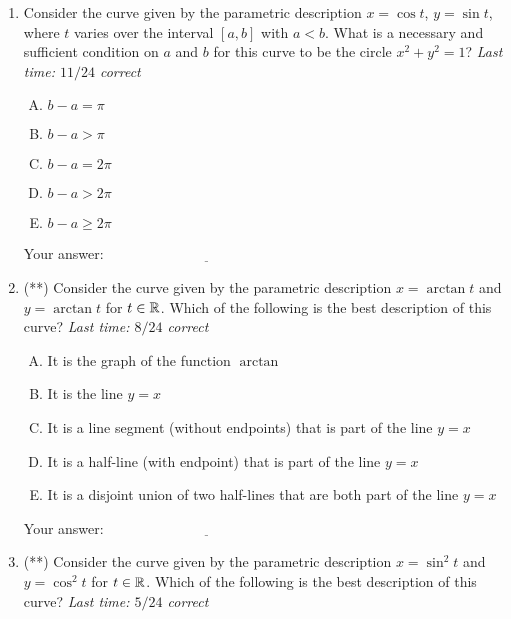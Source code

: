 \documentclass[10pt]{amsart}
\begin{document}
\begin{enumerate}
\item Consider the curve given by the parametric description $x = \cos
  t$, $y = \sin t$, where $t$ varies over the interval $[a,b]$ with $a
  < b$. What is a necessary and sufficient condition on $a$ and $b$
  for this curve to be the circle $x^2 + y^2 = 1$? {\em Last time:
    $11/24$ correct}

  \begin{enumerate}[(A)]
  \item $b - a =\pi$
  \item $b - a > \pi$
  \item $b - a = 2\pi$
  \item $b - a > 2\pi$
  \item $b - a \ge 2\pi$
  \end{enumerate}

  \vspace{0.1in}
  Your answer: $\underline{\qquad\qquad\qquad\qquad\qquad\qquad\qquad}$
  \vspace{0.6in}

\item (**) Consider the curve given by the parametric description $x =
  \arctan t$ and $y = \arctan t$ for $t \in \mathbb{R}$. Which of the
  following is the best description of this curve? {\em Last time:
    $8/24$ correct}

  \begin{enumerate}[(A)]
  \item It is the graph of the function $\arctan$
  \item It is the line $y = x$
  \item It is a line segment (without endpoints) that is part of the
    line $y = x$
  \item It is a half-line (with endpoint) that is part of the line $y
    = x$
  \item It is a disjoint union of two half-lines that are both part of
    the line $y = x$
  \end{enumerate}

  \vspace{0.1in}
  Your answer: $\underline{\qquad\qquad\qquad\qquad\qquad\qquad\qquad}$
  \vspace{0.6in}

\item (**) Consider the curve given by the parametric description $x =
  \sin^2t$ and $y = \cos^2t$ for $t \in \mathbb{R}$. Which of the following is
  the best description of this curve? {\em Last time: $5/24$ correct}


\end{enumerate}
\end{document}
